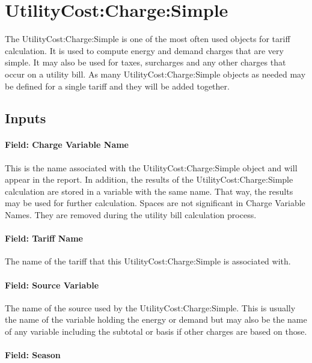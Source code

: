 \section{UtilityCost:Charge:Simple}\label{utilitycostchargesimple}

The UtilityCost:Charge:Simple is one of the most often used objects for tariff calculation. It is used to compute energy and demand charges that are very simple. It may also be used for taxes, surcharges and any other charges that occur on a utility bill. As many UtilityCost:Charge:Simple objects as needed may be defined for a single tariff and they will be added together.

\subsection{Inputs}\label{inputs-068}

\paragraph{Field: Charge Variable Name}\label{field-charge-variable-name-000}

This is the name associated with the UtilityCost:Charge:Simple object and will appear in the report. In addition, the results of the UtilityCost:Charge:Simple calculation are stored in a variable with the same name. That way, the results may be used for further calculation. Spaces are not significant in Charge Variable Names. They are removed during the utility bill calculation process.

\paragraph{Field: Tariff Name}\label{field-tariff-name-000}

The name of the tariff that this UtilityCost:Charge:Simple is associated with.

\paragraph{Field: Source Variable}\label{field-source-variable-000}

The name of the source used by the UtilityCost:Charge:Simple. This is usually the name of the variable holding the energy or demand but may also be the name of any variable including the subtotal or basis if other charges are based on those.

\paragraph{Field: Season}\label{field-season-000}

